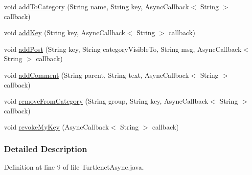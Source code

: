 \begin{DoxyCompactItemize}
\item 
void \hyperlink{interfaceballmerpeak_1_1turtlenet_1_1client_1_1TurtlenetAsync_a8540db4f0ac20ac80e8bca4346761257}{add\-To\-Category} (String name, String key, Async\-Callback$<$ String $>$ callback)
\item 
void \hyperlink{interfaceballmerpeak_1_1turtlenet_1_1client_1_1TurtlenetAsync_a165c61e5dc2d3aac741bf47c07186b01}{add\-Key} (String key, Async\-Callback$<$ String $>$ callback)
\item 
void \hyperlink{interfaceballmerpeak_1_1turtlenet_1_1client_1_1TurtlenetAsync_a6bc9fd822a1776de7cb42561e567cc18}{add\-Post} (String key, String category\-Visible\-To, String msg, Async\-Callback$<$ String $>$ callback)
\item 
void \hyperlink{interfaceballmerpeak_1_1turtlenet_1_1client_1_1TurtlenetAsync_a83a5d15e18989bb17ac0bc36d4112dc9}{add\-Comment} (String parent, String text, Async\-Callback$<$ String $>$ callback)
\item 
void \hyperlink{interfaceballmerpeak_1_1turtlenet_1_1client_1_1TurtlenetAsync_a9b2834a568cdf734a62200928a259eb2}{remove\-From\-Category} (String group, String key, Async\-Callback$<$ String $>$ callback)
\item 
void \hyperlink{interfaceballmerpeak_1_1turtlenet_1_1client_1_1TurtlenetAsync_a03d97f6d5e9f45f538af9c45eb460b94}{revoke\-My\-Key} (Async\-Callback$<$ String $>$ callback)
\end{DoxyCompactItemize}


\subsubsection{Detailed Description}


Definition at line 9 of file Turtlenet\-Async.\-java.



